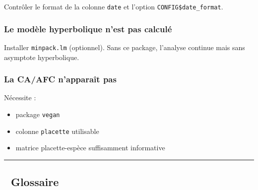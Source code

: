 Contrôler le format de la colonne \texttt{date} et l'option
\texttt{CONFIG\$date\_format}.

\subsubsection{Le modèle hyperbolique n'est pas
calculé}\label{le-moduxe8le-hyperbolique-nest-pas-calculuxe9}

Installer \texttt{minpack.lm} (optionnel). Sans ce package, l'analyse
continue mais sans asymptote hyperbolique.

\subsubsection{La CA/AFC n'apparaît
pas}\label{la-caafc-napparauxeet-pas}

Nécessite :

\begin{itemize}
\tightlist
\item
  package \texttt{vegan}
\item
  colonne \texttt{placette} utilisable
\item
  matrice placette-espèce suffisamment informative
\end{itemize}

\begin{center}\rule{0.5\linewidth}{0.5pt}\end{center}

\subsection{🧾 Glossaire}\label{glossaire}

